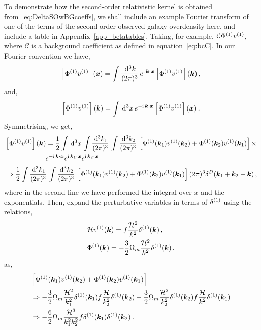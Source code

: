To demonstrate how the second-order relativistic kernel is obtained from~\eqref{eq:DeltaSOwBGcoeffs}, we shall include an example Fourier transform of one of the terms of the second-order observed galaxy overdensity here, and include a table in Appendix~\ref{app_betatables}.
Taking, for example, $\mathcal{C} \Phi^{(1)} v^{(1)}$, where $\mathcal{C}$ is a background coefficient as defined in equation~\eqref{eq:bcC}. In our Fourier convention we have, 
\begin{equation}
	\left[ \Phi^{(1)} v^{(1)} \right](\bm {x}) = \int \frac{\,\mathrm{d}^3 k}{(2\pi)^3}\, e^{\mathrm{i\,} \bm {k}\cdot\bm {x}} \left[ \Phi^{(1)} v^{(1)} \right] (\bm {k})\,,
\end{equation}
and, 
\begin{equation}
	\left[ \Phi^{(1)} v^{(1)} \right](\bm {k}) = \int \,\mathrm{d}^3 x\, e^{- \mathrm{i\,} \bm {k}\cdot\bm {x}} \left[ \Phi^{(1)} v^{(1)} \right](\bm {x})\,.
\end{equation}
Symmetrising, we get, 
\begin{align}
	&\left[ \Phi^{(1)} v^{(1)} \right](\bm {k}) = \frac{1}{2} \int \,\mathrm{d}^3 x\, \int \frac{\,\mathrm{d}^3 k_1}{(2 \pi)^3}\, \int \frac{\,\mathrm{d}^3 k_2}{(2\pi)^3}\, \left[ \Phi^{(1)}(\bm {k}_1) v^{(1)}(\bm {k}_2) + \Phi^{(1)}(\bm {k}_2) v^{(1)}(\bm {k}_1) \right] \times \nonumber \\
	& \qquad\qquad\qquad e^{-\mathrm{i\,} \bm {k}\cdot\bm {x}} e^{\mathrm{i\,} \bm {k}_1\cdot\bm {x}} e^{\mathrm{i\,} \bm {k}_2\cdot\bm {x}} \\
	&\Rightarrow \frac{1}{2} \int\frac{\,\mathrm{d}^3 k_1}{(2\pi)^3}\,\int \frac{\,\mathrm{d}^3 k_2}{(2\pi)^3}\, \left[ \Phi^{(1)}(\bm {k}_1) v^{(1)}(\bm {k}_2) + \Phi^{(1)}(\bm {k}_2) v^{(1)}(\bm {k}_1)\right] (2\pi)^3 \delta^D(\bm {k}_1+\bm {k}_2-\bm {k})\,,
\end{align}
where in the second line we have performed the integral over $x$ and the exponentials. Then, expand the perturbative variables in terms of $\delta^{(1)}$ using the relations,
\begin{align}
	&\mathcal{H} v^{(1)}(\bm {k}) = f \frac{\mathcal{H}^2}{k^2} \delta^{(1)}(\bm {k})\,,\\
	&\Phi^{(1)}(\bm {k}) = - \frac{3}{2} \Omega_m \frac{\mathcal{H}^2}{k^2} \delta^{(1)}(\bm {k})\,,
\end{align}
as, 
\begin{align}
	&\left[ \Phi^{(1)}(\bm {k}_1) v^{(1)}(\bm {k}_2) + \Phi^{(1)}(\bm {k}_2) v^{(1)}(\bm {k}_1) \right]\\
	&\Rightarrow - \frac{3}{2} \Omega_m \frac{\mathcal{H}^2}{k_1^2} \delta^{(1)}(\bm {k}_1) f \frac{\mathcal{H}}{k_2^2} \delta^{(1)}(\bm {k}_2) - \frac{3}{2} \Omega_m \frac{\mathcal{H}^2}{k_2^2} \delta^{(1)}(\bm {k}_2) f \frac{\mathcal{H}}{k_1^2} \delta^{(1)}(\bm {k}_1)\\
	&\Rightarrow - \frac{6}{2} \Omega_m \frac{\mathcal{H}^3}{k_1^2 k_2^2} f \delta^{(1)}(\bm {k}_1) \delta^{(1)}(\bm {k}_2)\,.
\end{align}
